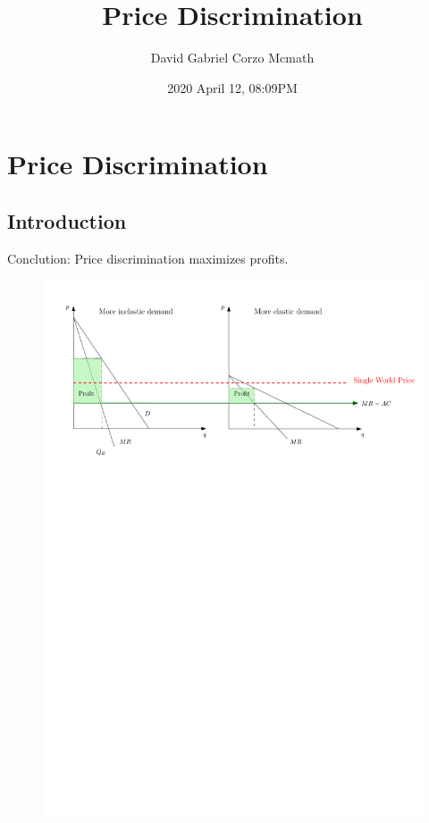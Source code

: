 \documentclass{article}
\title{Price Discrimination}
\date{2020 April 12, 08:09PM}
\author{David Gabriel Corzo Mcmath}
\begin{document}
\maketitle

\section{Price Discrimination}

\subsection{Introduction}
Conclution: Price discrimination maximizes profits.
\begin{figure}[H]
    \centering
    \includegraphics[width=17cm]{figs/price_discrimination.pdf} 
\end{figure}
\end{document}
